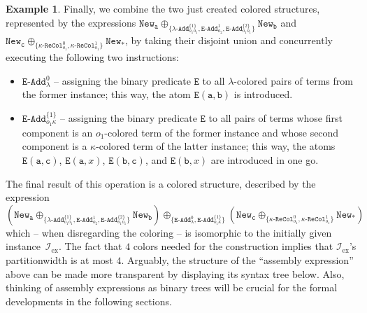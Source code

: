 \documentclass[10pt,a4paper]{amsart}
\theoremstyle{definition}
\newtheorem{exa}[exa]{Example}
\numberwithin{equation}{section}
\theoremstyle{plain}
\theoremstyle{definition}
\newtheorem{example}[example]{Example}
\theoremstyle{myexample}
\renewenvironment{example}%
{
	\begin{shaded*}	
		\vspace{-1.5ex}
		\begin{exa}%
		}{
		\end{exa}
		\vspace{-1.5ex}
	\end{shaded*}
}
\theoremstyle{plain}
\theoremstyle{definition}
\newcommand{\origcol}{o}
\newcommand{\newconst}[1]{\pred{New}_{\const{#1}}} %
\newcommand{\newanon}{\pred{New}_{\const{*}}} %
\newcommand{\cadd}[4]{#4\pred{\texttt{-}Add}^{#3}_{#1#2}} %
\newcommand{\radd}[4]{#4\pred{\texttt{-}Add}^{#3}_{#1#2}}
\newcommand{\unradd}[2]{#2\pred{\texttt{-}Add}_{#1}}
\newcommand{\recol}[2]{#2\pred{\texttt{-}ReCol}_{#1}}
\newcommand{\pred}[1]{\mathtt{#1}}
\newcommand{\const}[1]{\mathtt{#1}}
\newcommand{\epred}{\pred{E}}
\begin{document}
\begin{example}
Finally, we combine the two just created colored structures, represented by the expressions 
$\newconst{a} \oplus_{\{ 	\cadd{\origcol_1}{\origcol_1}{\{1\}}{\lambda},
	\unradd{\origcol_{2}}{\epred}^{1}, 
	\radd{\origcol_1}{\origcol_1}{\{2\}}{\epred} \}} \newconst{b}$ 
and
$\newconst{c} \oplus_{\{\recol{\origcol_{1}}{\kappa}^0, \recol{\origcol_{1}}{\kappa}^1\}} \newanon$, by taking their disjoint union and concurrently executing the following two instructions:
\begin{itemize}
\item $\unradd{\lambda}{\epred}^{0}$ -- assigning the binary predicate $\pred{E}$ to all $\lambda$-colored pairs of terms from the former instance; this way, the atom $\pred{E}(\const{a},\const{b})$ is introduced.
\item $\radd{\origcol_1}{\kappa}{\{1\}}{\epred}$ -- assigning the binary predicate $\pred{E}$ to all pairs of terms whose first component is an $o_1$-colored term of the former instance and whose second component  is a $\kappa$-colored term of the latter instance; this way, the atoms $\pred{E}(\const{a},\const{c})$, $\pred{E}(\const{a},x)$, $\pred{E}(\const{b},\const{c})$, and $\pred{E}(\const{b},x)$ are introduced in one go.
\end{itemize}
%
The final result of this operation is a colored structure, described by the expression
%
$$
(\newconst{a} 
\oplus_{\{ 
			\cadd{\origcol_1}{\origcol_1}{\{1\}}{\lambda},
			\unradd{\origcol_{2}}{\epred}^{1}, 
			\radd{\origcol_1}{\origcol_1}{\{2\}}{\epred}
	    \}} 
\newconst{b}) 
%
\oplus_{\{
			\unradd{\lambda}{\epred}^{0},
			\radd{\origcol_1}{\kappa}{\{1\}}{\epred}
		\}} 
%
(\newconst{c} 
\oplus_{\{
		\recol{\origcol_{1}}{\kappa}^0, 
		\recol{\origcol_{1}}{\kappa}^1
		\}} 
\newanon)
$$%
%
which -- when disregarding the coloring -- is isomorphic to the initially given instance~$\mathcal{I}_\mathrm{ex}$. 
The fact that $4$ colors needed for the construction implies that $\mathcal{I}_\mathrm{ex}$'s partitionwidth is at most $4$.
Arguably, the structure of the ``assembly expression'' above can be made more transparent by displaying its syntax tree below. Also, thinking of assembly expressions as binary trees will be crucial for the formal developments in the following sections.   

\bigskip 
\hspace{5ex}\scalebox{0.9}{\begin{tikzpicture}%
	[
	    level 1/.style={sibling distance=60mm, level distance=16mm},
	    level 2/.style={sibling distance=30mm, level distance=16mm},
	    level 3/.style={sibling distance=30mm, level distance=10mm},
	    level 4/.style={sibling distance=20mm, level distance=10mm},
	    level 5/.style={sibling distance=15mm, level distance=10mm}
	]
	

\end{tikzpicture}}
\end{example}
\end{document}
